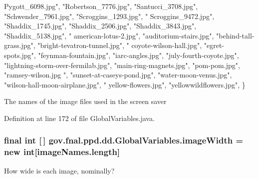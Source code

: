 \begin{DoxyCode}
{      Pygott\_6098.jpg"},
            \textcolor{stringliteral}{"Robertson\_7776.jpg"}, \textcolor{stringliteral}{"Santucci\_3708.jpg"}, \textcolor{stringliteral}{"Schwender\_7961.jpg"}, \textcolor{stringliteral}{"Scroggins\_1293.jpg"}, \textcolor{stringliteral}{"
      Scroggins\_9472.jpg"},
            \textcolor{stringliteral}{"Shaddix\_1745.jpg"}, \textcolor{stringliteral}{"Shaddix\_2506.jpg"}, \textcolor{stringliteral}{"Shaddix\_3843.jpg"}, \textcolor{stringliteral}{"Shaddix\_5138.jpg"}, \textcolor{stringliteral}{"
      american-lotus-2.jpg"},
            \textcolor{stringliteral}{"auditorium-stairs.jpg"}, \textcolor{stringliteral}{"behind-tall-grass.jpg"}, \textcolor{stringliteral}{"bright-tevatron-tunnel.jpg"}, \textcolor{stringliteral}{"
      coyote-wilson-hall.jpg"},
            \textcolor{stringliteral}{"egret-spots.jpg"}, \textcolor{stringliteral}{"feynman-fountain.jpg"}, \textcolor{stringliteral}{"iarc-angles.jpg"}, \textcolor{stringliteral}{"july-fourth-coyote.jpg"},
            \textcolor{stringliteral}{"lightning-storm-over-fermilab.jpg"}, \textcolor{stringliteral}{"main-ring-magnets.jpg"}, \textcolor{stringliteral}{"pom-pom.jpg"}, \textcolor{stringliteral}{"ramsey-wilson.jpg
      "},
            \textcolor{stringliteral}{"sunset-at-caseys-pond.jpg"}, \textcolor{stringliteral}{"water-moon-venus.jpg"}, \textcolor{stringliteral}{"wilson-hall-moon-airplane.jpg"}, \textcolor{stringliteral}{"
      yellow-flowers.jpg"},
            \textcolor{stringliteral}{"yellowwildflowers.jpg"}, \}
\end{DoxyCode}
The names of the image files used in the screen saver 

Definition at line 172 of file Global\-Variables.\-java.

\hypertarget{classgov_1_1fnal_1_1ppd_1_1dd_1_1GlobalVariables_a88625f4c1de90b1b1bb20c05fd993617}{
\subsubsection[{image\-Width}]{\setlength{\rightskip}{0pt plus 5cm}final int \mbox{[}$\,$\mbox{]} gov.\-fnal.\-ppd.\-dd.\-Global\-Variables.\-image\-Width = new int\mbox{[}image\-Names.\-length\mbox{]}\hspace{0.3cm}{\ttfamily [static]}}}\label{classgov_1_1fnal_1_1ppd_1_1dd_1_1GlobalVariables_a88625f4c1de90b1b1bb20c05fd993617}
How wide is each image, nominally? 

